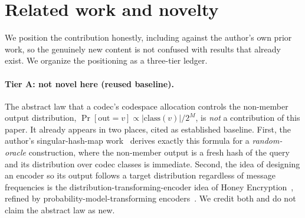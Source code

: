 \documentclass[11pt]{article}
\theoremstyle{definition}
\theoremstyle{plain}
\theoremstyle{remark}
\newcommand{\class}{\mathrm{class}}
\begin{document}
\section{Related work and novelty}
\label{sec:related}

We position the contribution honestly, including against the author's own prior work, so
the genuinely new content is not confused with results that already exist. We organize the
positioning as a three-tier ledger.

\paragraph{Tier A: not novel here (reused baseline).}
The abstract law that a codec's codespace allocation controls the non-member output
distribution, $\Pr[\mathrm{out} = v] \propto |\class(v)|/2^M$, is \emph{not} a contribution
of this paper. It already appears in two places, cited as established baseline. First, the
author's singular-hash-map work~\cite{towell_bernoulli_maps} derives exactly this formula
for a \emph{random-oracle} construction, where the non-member output is a fresh hash of the
query and its distribution over codec classes is immediate. Second, the idea of designing an
encoder so its output follows a target distribution regardless of message frequencies is the
distribution-transforming-encoder idea of Honey Encryption~\cite{juels2014honey}, refined by
probability-model-transforming encoders~\cite{cheng2019pmte}. We credit both and do not claim
the abstract law as new.
\end{document}
